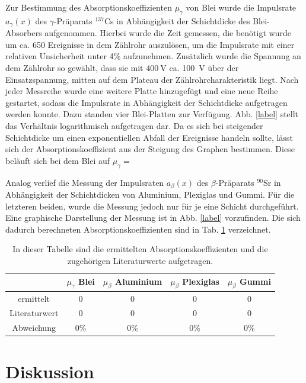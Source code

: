 	Zur Bestimmung des Absorptionskoeffizienten $\mu_\gamma$ von Blei wurde die Impulsrate $a_\gamma (x)$ des $\gamma$-Präparats $^{137}$Cs in Abhängigkeit der Schichtdicke des Blei-Absorbers aufgenommen.	
	Hierbei wurde die Zeit gemessen, die benötigt wurde um ca. 650 Ereignisse in dem Zählrohr auszulösen, um die Impulsrate mit einer relativen Unsicherheit unter 4\% aufzunehmen.
	Zusätzlich wurde die Spannung an dem Zählrohr so gewählt, dass sie mit $\SI{400}{\volt}$ ca. \SI{100}{\volt} über der Einsatzspannung, mitten auf dem Plateau der Zählrohrcharakteristik liegt.
	Nach jeder Messreihe wurde eine weitere Platte hinzugefügt und eine neue Reihe gestartet, sodass die Impulsrate in Abhängigkeit der Schichtdicke aufgetragen werden konnte.
	Dazu standen vier Blei-Platten zur Verfügung.
	Abb. \ref{label} stellt das Verhältnis logarithmisch aufgetragen dar. %
	Da es sich bei steigender Schichtdicke um einen exponentiellen Abfall der Ereignisse handeln sollte, lässt sich der Absorptionskoeffizient aus der Steigung des Graphen bestimmen.
	Diese beläuft sich bei dem Blei auf $\mu_\gamma = $ %
	
	Analog verlief die Messung der Impulsraten $a_\beta (x)$ des $\beta$-Präparats $^{90}$Sr in Abhängigkeit der Schichtdicken von Aluminium, Plexiglas und Gummi.
	Für die letzteren beiden, wurde die Messung jedoch nur für je eine Schicht durchgeführt.
	Eine graphische Darstellung der Messung ist in Abb. \ref{label} vorzufinden. %
	Die sich dadurch berechneten Absorptionskoeffizienten sind in Tab. \ref{tab:Werte} verzeichnet. %
	
	\begin{table}
		\caption{In dieser Tabelle sind die ermittelten Absorptionskoeffizienten und die zugehörigen Literaturwerte\cite{temp} aufgetragen.}
		\label{tab:Werte}
		\centering
		\begin{tabular}{c|c|c|c|c}					
				& $\mu_\gamma$ Blei &  $\mu_\beta$ Aluminium & $\mu_\beta$ Plexiglas &$\mu_\beta$ Gummi \\
			\hline	
			ermittelt & \SI{0}{} & \SI{0}{} & \SI{0}{} & \SI{0}{} \\
			Literaturwert & \SI{0}{} & \SI{0}{} & \SI{0}{} & \SI{0}{} \\
			\hline
			Abweichung & 0\% & 0\% & 0\% & 0\% \\		
		\end{tabular}
	\end{table}
	
\section{Diskussion}
	
